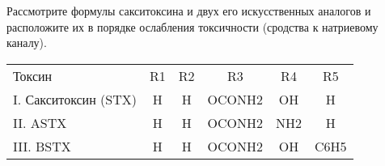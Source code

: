 
Рассмотрите формулы сакситоксина и двух его искусственных аналогов и расположите их в порядке ослабления токсичности (сродства к натриевому каналу).


\begin{tabular}{|l|c|c|c|c|c|}
Токсин&R1&R2&R3&R4&R5\\
I. Сакситоксин (STX)&H&H&OCONH2&OH&H\\
II. ASTX&H&H&OCONH2&NH2&H\\
III. BSTX&H&H&OCONH2&OH&C6H5\\
\end{tabular}


